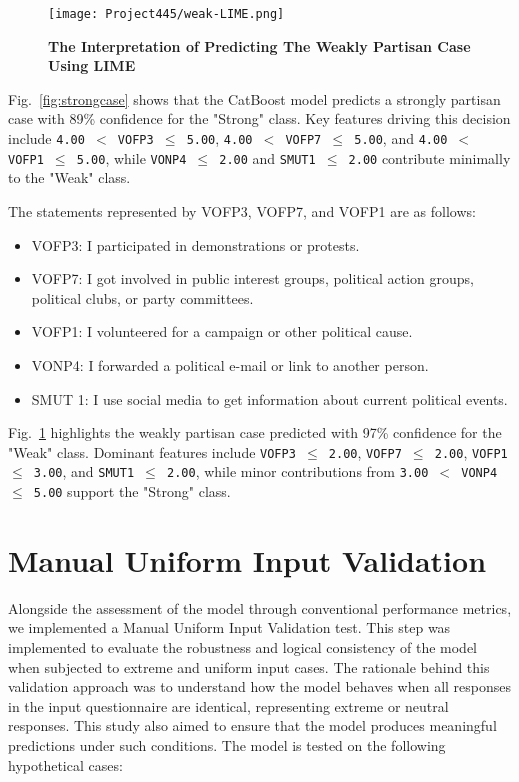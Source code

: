 \documentclass[pt]{article}  %
\begin{document}
\begin{figure}[H]
    \centering
    \texttt{[image: Project445/weak-LIME.png]} %
    \caption{\textbf{\small The Interpretation of Predicting The Weakly Partisan Case Using LIME}}
    \label{fig:weakcase}
\end{figure}

Fig.~\ref{fig:strongcase} shows that the CatBoost model predicts a strongly partisan case with 89\% confidence for the "Strong" class. Key features driving this decision include \texttt{4.00 $<$ VOFP3 $\leq$ 5.00}, \texttt{4.00 $<$ VOFP7 $\leq$ 5.00}, and \texttt{4.00 $<$ VOFP1 $\leq$ 5.00}, while \texttt{VONP4 $\leq$ 2.00} and \texttt{SMUT1 $\leq$ 2.00} contribute minimally to the "Weak" class.

 The statements represented by VOFP3, VOFP7, and VOFP1 are as follows:

	\begin{itemize}
    \item 	VOFP3: I participated in demonstrations or protests.
	\item 	VOFP7: I got involved in public interest groups, political action         groups, political clubs, or party committees.
	\item 	VOFP1: I volunteered for a campaign or other political cause.
    \item   VONP4: I forwarded a political e-mail or link to another person.
    \item   SMUT 1: I use social media to get information about current political events.
    \end{itemize}

    Fig.~\ref{fig:weakcase} highlights the weakly partisan case predicted with 97\% confidence for the "Weak" class. Dominant features include \texttt{VOFP3 $\leq$ 2.00}, \texttt{VOFP7 $\leq$ 2.00}, \texttt{VOFP1 $\leq$ 3.00}, and \texttt{SMUT1 $\leq$ 2.00}, while minor contributions from \texttt{3.00 $<$ VONP4 $\leq$ 5.00} support the "Strong" class.

\section{Manual Uniform Input Validation}
Alongside the assessment of the model through conventional performance metrics, we implemented a Manual Uniform Input Validation test. This step was implemented to evaluate the robustness and logical consistency of the model when subjected to extreme and uniform input cases. The rationale behind this validation approach was to understand how the model behaves when all responses in the input questionnaire are identical, representing extreme or neutral responses. This study also aimed to ensure that the model produces meaningful predictions under such conditions. The model is tested on the following hypothetical cases:
\end{document}
